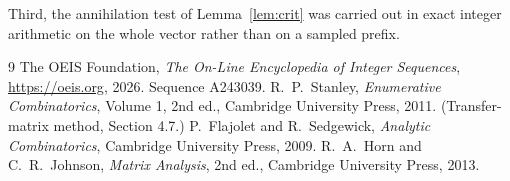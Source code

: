 \documentclass[11pt,a4paper]{article}
\theoremstyle{plain}
\theoremstyle{definition}
\begin{document}
Third, the annihilation test of Lemma~\ref{lem:crit} was carried out in exact integer
arithmetic on the whole vector rather than on a sampled prefix.

\begin{thebibliography}{9}
 The OEIS Foundation, \emph{The On-Line Encyclopedia of Integer
Sequences}, \url{https://oeis.org}, 2026. Sequence A243039.
 R.~P.~Stanley, \emph{Enumerative Combinatorics}, Volume 1, 2nd ed.,
Cambridge University Press, 2011. (Transfer-matrix method, Section 4.7.)
 P.~Flajolet and R.~Sedgewick, \emph{Analytic Combinatorics}, Cambridge
University Press, 2009.
 R.~A.~Horn and C.~R.~Johnson, \emph{Matrix Analysis}, 2nd ed., Cambridge
University Press, 2013.
\end{thebibliography}
\end{document}
